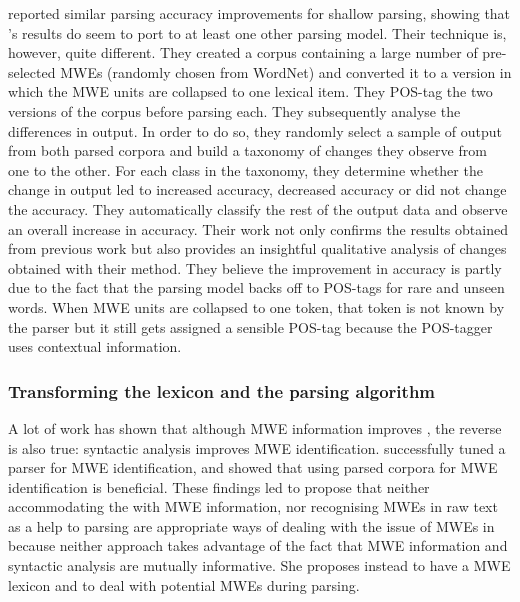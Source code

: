\documentclass[output=paper]{langsci/langscibook}
\begin{document}
                        \indent \citet{korkontzelosetal2010} reported similar parsing accuracy improvements for shallow parsing, showing that \citet{nivre2004multiword}'s results do seem to port to at least one other parsing model. Their technique is, however, quite different. They created a corpus containing a large number of pre-selected MWEs (randomly chosen from WordNet) and converted it to a version in which the MWE units are collapsed to one lexical item. They POS-tag the two versions of the corpus before parsing each. They subsequently analyse the differences in output. In order to do so, they randomly select a sample of output from both parsed corpora and build a taxonomy of changes they observe from one to the other. For each class in the taxonomy, they determine whether the change in output led to increased accuracy, decreased accuracy or did not change the accuracy. They automatically classify the rest of the output data and observe an overall increase in accuracy. Their work not only confirms the results obtained from previous work but also provides an insightful qualitative analysis of changes obtained with their method. They believe the improvement in accuracy is partly due to the fact that the parsing model backs off to POS-tags for rare and unseen words. When MWE units are collapsed to one token, that token is not known by the parser but it still gets assigned a sensible POS-tag because the POS-tagger uses contextual information. 
                        \subsubsection{Transforming the lexicon and the parsing algorithm}
                        \indent A lot of work has shown that although MWE information improves , the reverse is also true: syntactic analysis improves MWE identification. \citet{green13} successfully tuned a parser for MWE identification, \citet{weller&heid2010} and \citet{martens&vandeghinste2010} showed that using parsed corpora for MWE identification is beneficial. These findings led \citet{seretan2013} to propose that neither accommodating the  with MWE information, nor recognising MWEs in raw text as a help to parsing are appropriate ways of dealing with the issue of MWEs in  because neither approach takes advantage of the fact that MWE information and syntactic analysis are mutually informative. She proposes instead to have a MWE lexicon and to deal with potential MWEs during parsing.
\end{document}
